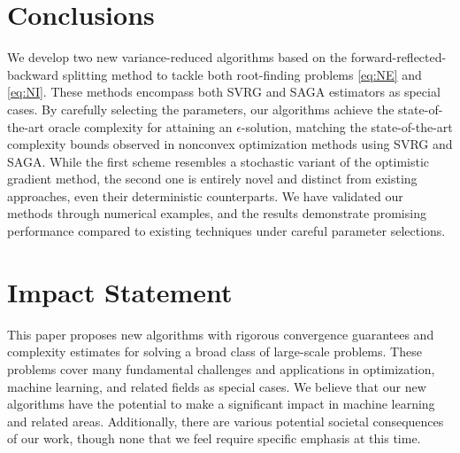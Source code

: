 \documentclass{article}
\newcommand{\aftersec}{\vspace{-1.25ex}}
\theoremstyle{plain}
\theoremstyle{definition}
\theoremstyle{remark}
\begin{document}
\section{Conclusions}\label{sec:conclusions}
\aftersec
\vspace{0.25ex}
We develop two new variance-reduced algorithms based on the forward-reflected-backward splitting method to tackle both root-finding problems \eqref{eq:NE} and  \eqref{eq:NI}.
These methods encompass both SVRG and SAGA estimators as special cases.
By carefully selecting the parameters, our algorithms achieve the state-of-the-art oracle complexity for attaining an $\epsilon$-solution, matching the state-of-the-art complexity bounds observed in nonconvex optimization methods using SVRG and SAGA. 
While the first scheme resembles a stochastic variant of the optimistic gradient method, the second one is entirely novel and distinct from existing approaches, even their deterministic counterparts.
We have validated our methods through numerical examples, and the results demonstrate promising performance compared to existing techniques under careful parameter selections.






\section*{Impact Statement}
This paper proposes new algorithms with rigorous convergence guarantees and complexity estimates for solving a broad class of large-scale problems. 
These problems cover many fundamental challenges and applications in optimization, machine learning, and related fields as special cases. 
We believe that our new algorithms have the potential to make a significant impact in machine learning and related areas. Additionally, there are various potential societal consequences of our work, though none that we feel require specific emphasis at this time.
\end{document}
